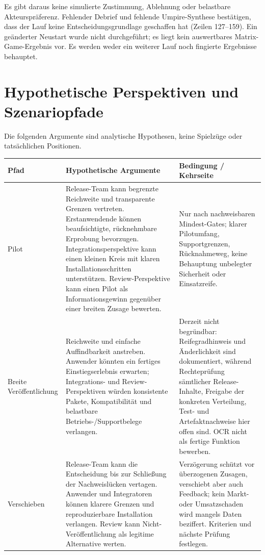 \documentclass[11pt,a4paper]{scrartcl}
\begin{document}
Es gibt daraus keine simulierte Zustimmung, Ablehnung oder belastbare Akteurspräferenz. Fehlender Debrief und fehlende Umpire-Synthese bestätigen, dass der Lauf keine Entscheidungsgrundlage geschaffen hat (Zeilen 127--159). Ein geänderter Neustart wurde nicht durchgeführt; es liegt kein auswertbares Matrix-Game-Ergebnis vor. Es werden weder ein weiterer Lauf noch fingierte Ergebnisse behauptet.

\section{Hypothetische Perspektiven und Szenariopfade}\label{sec:pfade}
Die folgenden Argumente sind analytische Hypothesen, keine Spielzüge oder tatsächlichen Positionen.

\begin{small}
\setlength{\tabcolsep}{3pt}
\noindent
\begin{tabularx}{\textwidth}{@{}>{\raggedright\arraybackslash}p{2.7cm}LL@{}}
\toprule
\textbf{Pfad} & \textbf{Hypothetische Argumente} & \textbf{Bedingung / Kehrseite} \\
\midrule
Pilot & Release-Team kann begrenzte Reichweite und transparente Grenzen vertreten. Erstanwendende können beaufsichtigte, rücknehmbare Erprobung bevorzugen. Integrationsperspektive kann einen kleinen Kreis mit klaren Installationsschritten unterstützen. Review-Perspektive kann einen Pilot als Informationsgewinn gegenüber einer breiten Zusage bewerten. & Nur nach nachweisbaren Mindest-Gates; klarer Pilotumfang, Supportgrenzen, Rücknahmeweg, keine Behauptung unbelegter Sicherheit oder Einsatzreife. \\
Breite Veröffent\-lichung & Reichweite und einfache Auffindbarkeit anstreben. Anwender könnten ein fertiges Einstiegserlebnis erwarten; Integrations- und Review-Perspektiven würden konsistente Pakete, Kompatibilität und belastbare Betriebs-/Supportbelege verlangen. & Derzeit nicht begründbar: Reifegradhinweis und Änderlichkeit sind dokumentiert, während Rechteprüfung sämtlicher Release-Inhalte, Freigabe der konkreten Verteilung, Test- und Artefaktnachweise hier offen sind. OCR nicht als fertige Funktion bewerben. \\
Verschieben & Release-Team kann die Entscheidung bis zur Schließung der Nachweislücken vertagen. Anwender und Integratoren können klarere Grenzen und reproduzierbare Installation verlangen. Review kann Nicht-Veröffentlichung als legitime Alternative werten. & Verzögerung schützt vor überzogenen Zusagen, verschiebt aber auch Feedback; kein Markt- oder Umsatzschaden wird mangels Daten beziffert. Kriterien und nächste Prüfung festlegen. \\
\bottomrule
\end{tabularx}
\end{small}
\end{document}
